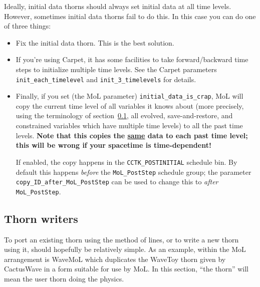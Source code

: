 Ideally, initial data thorns should always set initial data at all time
levels.  However, sometimes initial data thorns fail to do this.  In
this case you can do one of three things:
\begin{itemize}
\item	Fix the initial data thorn.  This is the best solution.
\item	If you're using Carpet, it has some facilities to take
	forward/backward time steps to initialize multiple time
	levels.  See the Carpet parameters
	\verb|init_each_timelevel| and
	\verb|init_3_timelevels| for details.
\item	Finally, if you set (the MoL parameter) \verb|initial_data_is_crap|,
	MoL will copy the current time level of all variables it
	knows about (more precisely, using the terminology of
	section~\ref{CactusBase_MoL_sec:writeruse}, all evolved,
	save-and-restore, and constrained variables which have
	multiple time levels) to all the past time levels.
	\textbf{Note that this copies the \underline{same} data
	to each past time level; this will be wrong if your
	spacetime is time-dependent!}

	If enabled, the copy happens in the \verb|CCTK_POSTINITIAL|
	schedule bin.  By default this happens \emph{before}
	the \verb|MoL_PostStep| schedule group; the parameter
	\verb|copy_ID_after_MoL_PostStep| can be used to change
	this to \emph{after} \verb|MoL_PostStep|.
\end{itemize}


\subsection{Thorn writers}
\label{CactusBase_MoL_sec:writeruse}

To port an existing thorn using the method of lines, or to write a new
thorn using it, should hopefully be relatively simple. As an example,
within the MoL arrangement is WaveMoL which duplicates the WaveToy
thorn given by CactusWave in a form suitable for use by MoL. In this
section, ``the thorn'' will mean the user thorn doing the physics.

